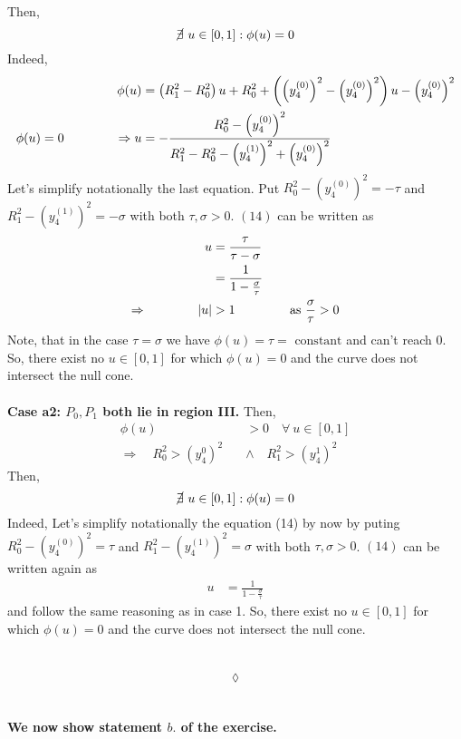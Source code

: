 Then, $$\cancel{\exists } \  u \in \left[0,1\right]: \phi(u)=0$$
Indeed,
\begin{align}
\phi(u) &= \left(R_1^2-R_0^2\right)u+R_0^2 + \left(\left(y_4^{(0)}\right)^2   -\left(y_4^{(0)}\right)^2 \right)u -\left(y_4^{(0)}\right)^2\\
\phi(u)=0\quad\quad\quad\quad \Rightarrow u&= -\frac{R_0^2- \left(y_4^{(0)}\right)^2}{R_1^2-R_0^2  -\left(y_4^{(1)}\right)^2  +\left(y_4^{(0)}\right)^2}
\end{align}
Let's simplify notationally the last equation. Put $R_0^2- \left(y_4^{(0)}\right)^2=-\tau $ and $R_1^2- \left(y_4^{(1)}\right)^2=-\sigma$ with both $\tau, \sigma > 0$. $(14)$ can be written as
\begin{align}
u&=\frac{\tau}{\tau-\sigma}\\
 &=\frac{1}{1-\frac{\sigma}{\tau}}\\
\Rightarrow\quad\quad\quad\quad \left|u\right| & > 1 \quad\quad\quad\quad \text{ as } \frac{\sigma}{\tau} >0
\end{align}
Note, that in the case $\tau=\sigma$ we have $\phi(u)= \tau = \text{ constant}$ and can't reach $0$.
So, there exist no $u\in\left[0,1\right]$ for which $\phi(u)=0$ and the curve does not intersect the null cone.\\\\
\textbf{Case a2: $P_0, P_1$ both lie in region III.} Then,\\
\begin{align}
\phi(u) & > 0\quad \forall \ u\in \left[0,1\right]\\
\Rightarrow\quad R_0^2 > (y_4^{0})^2 \quad &\wedge \quad  R_1^2 > (y_4^{1})^2 
\end{align}
Then, $$\cancel{\exists } \  u \in \left[0,1\right]: \phi(u)=0$$
Indeed,
Let's simplify  notationally the  equation (14) by now by puting $R_0^2- \left(y_4^{(0)}\right)^2=\tau $ and $R_1^2- \left(y_4^{(1)}\right)^2=\sigma$ with both $\tau, \sigma > 0$. $(14)$ can be written again as
\begin{align}
u& =\frac{1}{1-\frac{\sigma}{\tau}}
\end{align}
and follow the same reasoning as in case 1.
So, there exist no $u\in\left[0,1\right]$ for which $\phi(u)=0$ and the curve does not intersect the null cone.\\\\
\\$$\lozenge$$\\\\
\textbf{We now show statement $\mathit{b.}$ of the exercise.}\\\\

